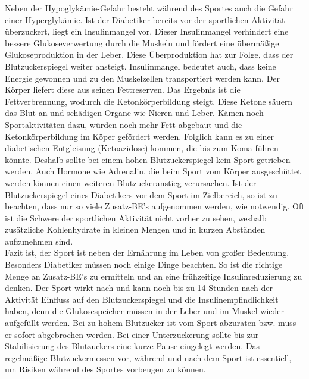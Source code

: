 	Neben der Hypoglykämie-Gefahr besteht während des Sportes auch die Gefahr einer Hyperglykämie. Ist der Diabetiker bereits vor der sportlichen Aktivität überzuckert, liegt ein Insulinmangel vor. Dieser Insulinmangel verhindert eine bessere Glukoseverwertung durch die Muskeln und fördert eine übermäßige Glukoseproduktion in der Leber. Diese Überproduktion hat zur Folge, dass der Blutzuckerspiegel weiter ansteigt. Insulinmangel bedeutet auch, dass keine Energie gewonnen und zu den Muskelzellen transportiert werden kann. Der Körper liefert diese aus seinen Fettreserven. Das Ergebnis ist die Fettverbrennung, wodurch die Ketonkörperbildung steigt. Diese Ketone säuern das Blut an und schädigen Organe wie Nieren und Leber. Kämen noch Sportaktivitäten dazu, würden noch mehr Fett abgebaut und die Ketonkörperbildung im Köper gefördert werden. Folglich kann es zu einer diabetischen Entgleisung (Ketoazidose) kommen, die bis zum Koma führen könnte. Deshalb sollte bei einem hohen Blutzuckerspiegel kein Sport getrieben werden. Auch Hormone wie Adrenalin, die beim Sport vom Körper ausgeschüttet werden können einen weiteren Blutzuckeranstieg verursachen. \newline
	Ist der Blutzuckerspiegel eines Diabetikers vor dem Sport im Zielbereich, so ist zu beachten, dass nur so viele Zusatz-BE’s aufgenommen werden, wie notwendig. Oft ist die Schwere der sportlichen Aktivität nicht vorher zu sehen, weshalb zusätzliche Kohlenhydrate in kleinen Mengen und in kurzen Abständen aufzunehmen sind. \cite{SG}\\
	Fazit ist, der Sport ist neben der Ernährung im Leben von großer Bedeutung. Besonders Diabetiker müssen noch einige Dinge beachten. So ist die richtige Menge an Zusatz-BE’s zu ermitteln und an eine frühzeitige Insulinreduzierung zu denken. Der Sport wirkt nach und kann noch bis zu 14 Stunden nach der Aktivität Einfluss auf den Blutzuckerspiegel und die Insulinempfindlichkeit haben, denn die Glukosespeicher müssen in der Leber und im Muskel wieder aufgefüllt werden. Bei zu hohem Blutzucker ist vom Sport abzuraten bzw. muss er sofort abgebrochen werden. Bei einer Unterzuckerung sollte bis zur Stabilisierung des Blutzuckers eine kurze Pause eingelegt werden. Das regelmäßige Blutzuckermessen vor, während und nach dem Sport ist essentiell, um Risiken während des Sportes vorbeugen zu können. \cite{SG}
